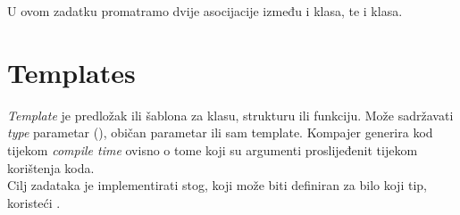 U ovom zadatku promatramo dvije asocijacije između  i  klasa, te  i  klasa.

\begin{codesection}
	
\end{codesection}

\begin{codelisting}
	
\end{codelisting}

\begin{codelisting}
	
\end{codelisting}

\begin{codelisting}
	
\end{codelisting}

\begin{codesection}
	
\end{codesection}

\pagebreak

\section{Templates}
\label{sec:temps}
\setcounter{lstlisting}{0}

\emph{Template} je predložak ili šablona za klasu, strukturu ili funkciju. Može sadržavati \emph{type} parametar (), običan parametar ili sam template. Kompajer generira kod tijekom \emph{compile time} ovisno o tome koji su argumenti proslijeđenit tijekom korištenja koda.\\

Cilj zadataka je implementirati stog, koji može biti definiran za bilo koji tip, koristeći .

\begin{codelisting}
	
\end{codelisting}


